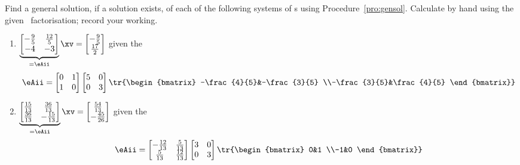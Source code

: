 \begin{exercise} \label{ex:hsledvs} 
Find a general solution, if a solution exists, of each of the following systems of s using Procedure~\ref{pro:gensol}.
Calculate by hand using the given \svd\ factorisation; record your working.
\begin{enumerate}
\item \(\underbrace{\begin{bmatrix} -\frac{9}{5}&\frac{12}{5}
\\-4&-3 \end{bmatrix}}_{=\eAii}\xv
=\begin{bmatrix} -\frac{9}{5}
\\\frac{17}{2} \end{bmatrix}\) given the \svd
\begin{equation*}
\eAii=\begin{bmatrix} 0&1
\\1&0 \end{bmatrix}
\begin{bmatrix} 5&0
\\0&3 \end{bmatrix}
\tr{\begin{bmatrix} -\frac{4}{5}&-\frac{3}{5}
\\-\frac{3}{5}&\frac{4}{5} \end{bmatrix}}
\end{equation*}

\item \(\underbrace{\begin{bmatrix} \frac{15}{13}&\frac{36}{13}
\\\frac{36}{13}&-\frac{15}{13} \end{bmatrix}}_{=\eAii}\xv
=\begin{bmatrix} \frac{54}{13}
\\-\frac{45}{26} \end{bmatrix}\) given the \svd
\begin{equation*}
\eAii=\begin{bmatrix} -\frac{12}{13}&\frac{5}{13}
\\\frac{5}{13}&\frac{12}{13} \end{bmatrix}
\begin{bmatrix} 3&0
\\0&3 \end{bmatrix}
\tr{\begin{bmatrix} 0&1
\\-1&0 \end{bmatrix}}
\end{equation*}


\end{enumerate}
\end{exercise}
